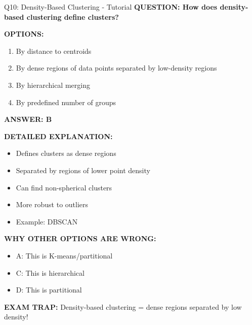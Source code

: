 \documentclass[8pt]{beamer}
\begin{document}
	\begin{frame}{Q10: Density-Based Clustering - Tutorial}
		\fontsize{6.5}{7.5}\selectfont
		\textbf{QUESTION: How does density-based clustering define clusters?}
		
		\vspace{0.1cm}
		\textbf{OPTIONS:}
		\begin{enumerate}
			\item By distance to centroids
			\item By dense regions of data points separated by low-density regions
			\item By hierarchical merging
			\item By predefined number of groups
		\end{enumerate}
		
		\vspace{0.1cm}
		\textcolor{myblue}{\textbf{ANSWER: B}}
		
		\vspace{0.1cm}
		\textbf{DETAILED EXPLANATION:}
		\begin{itemize}
			\item Defines clusters as dense regions
			\item Separated by regions of lower point density
			\item Can find non-spherical clusters
			\item More robust to outliers
			\item Example: DBSCAN
		\end{itemize}
		
		\vspace{0.1cm}
		\textcolor{myred}{\textbf{WHY OTHER OPTIONS ARE WRONG:}}
		\begin{itemize}
			\item \textcolor{myred}{A:} This is K-means/partitional
			\item \textcolor{myred}{C:} This is hierarchical
			\item \textcolor{myred}{D:} This is partitional
		\end{itemize}
		
		\textcolor{myred}{\textbf{EXAM TRAP:}} Density-based clustering = \textcolor{myblue}{dense regions separated by low density}!
	\end{frame}
	
	
\end{document}

